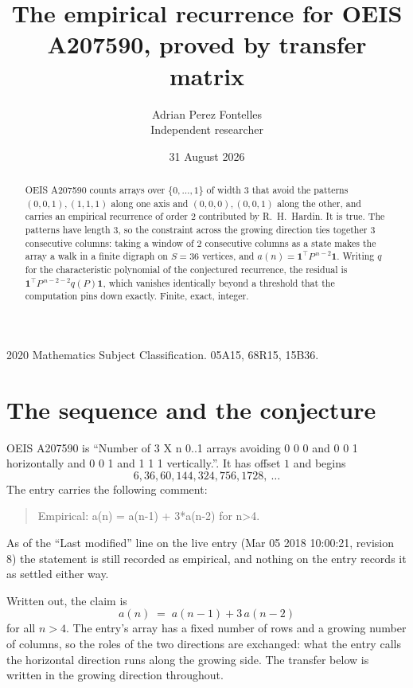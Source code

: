 \documentclass[11pt,a4paper]{article}
\title{The empirical recurrence for OEIS A207590, proved by transfer matrix}
\author{Adrian Perez Fontelles\\ \small Independent researcher}
\date{31 August 2026}
\theoremstyle{plain}
\theoremstyle{definition}
\begin{document}
\maketitle

\begin{abstract}
OEIS A207590 counts arrays over $\{0,\dots,1\}$ of width $3$ that avoid the patterns
$(0,0,1), (1,1,1)$ along one axis and $(0,0,0), (0,0,1)$ along the other, and carries an empirical recurrence of
order $2$ contributed by R.~H.~Hardin. It is true. The patterns have length $3$, so
the constraint across the growing direction ties together $3$ consecutive columns: taking a
window of $2$ consecutive columns as a state makes the array a walk in a finite digraph
on $S=36$ vertices, and $a(n)=\mathbf{1}^{\!\top}P^{\,n-2}\mathbf{1}$. Writing $q$
for the characteristic polynomial of the conjectured recurrence, the residual is
$\mathbf{1}^{\!\top}P^{\,n-2-2}q(P)\mathbf{1}$, which vanishes identically
beyond a threshold that the computation pins down exactly. Finite, exact, integer.
\end{abstract}

\noindent\small 2020 Mathematics Subject Classification. 05A15, 68R15, 15B36.\normalsize

\section{The sequence and the conjecture}

OEIS A207590 is ``Number of 3 X n 0..1 arrays avoiding 0 0 0 and 0 0 1 horizontally and 0 0 1 and 1 1 1 vertically.''. It has offset
$1$ and begins
\[
6, 36, 60, 144, 324, 756, 1728,\ \dots
\]
The entry carries the following comment:
\begin{quote}\small
Empirical: a(n) = a(n-1) + 3*a(n-2) for n>4.
\end{quote}
As of the ``Last modified'' line on the live entry (Mar 05 2018 10:00:21, revision
8) the statement is still recorded as empirical, and nothing on the entry
records it as settled either way.

Written out, the claim is
\begin{equation}\label{eq:conj}
a(n)\;=\;a(n-1) + 3\,a(n-2)
\end{equation}
for all $n>4$. The entry's array has a fixed number of rows and a growing number of
columns, so the roles of the two directions are exchanged: what the entry calls the
horizontal direction runs along the growing side. The transfer below is written in the
growing direction throughout.
\end{document}
